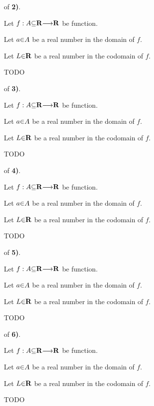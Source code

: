 \vs
{} of {\bf 2)}. \par
Let $f: A\p\subseteq\R \to \R$ be function. \par
Let $a \p\in A$  be a real number in the domain   of $f$. \par
Let $L \p\in \R$ be a real number in the codomain of $f$. \par
TODO

\vs
{} of {\bf 3)}. \par
Let $f: A\p\subseteq\R \to \R$ be function. \par
Let $a \p\in A$  be a real number in the domain   of $f$. \par
Let $L \p\in \R$ be a real number in the codomain of $f$. \par
TODO

\vs
{} of {\bf 4)}. \par
Let $f: A\p\subseteq\R \to \R$ be function. \par
Let $a \p\in A$  be a real number in the domain   of $f$. \par
Let $L \p\in \R$ be a real number in the codomain of $f$. \par
TODO

\vs
{} of {\bf 5)}. \par
Let $f: A\p\subseteq\R \to \R$ be function. \par
Let $a \p\in A$  be a real number in the domain   of $f$. \par
Let $L \p\in \R$ be a real number in the codomain of $f$. \par
TODO

\vs
{} of {\bf 6)}. \par
Let $f: A\p\subseteq\R \to \R$ be function. \par
Let $a \p\in A$  be a real number in the domain   of $f$. \par
Let $L \p\in \R$ be a real number in the codomain of $f$. \par
TODO



